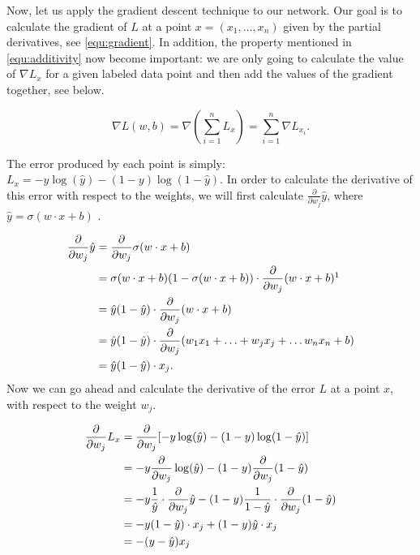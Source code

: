 Now, let us apply the gradient descent technique to our network. Our goal is to calculate the gradient of $L$ at a point $x = (x_1, \ldots, x_n)$ given by the partial derivatives, see \cref{equ:gradient}. In addition, the property mentioned in \cref{equ:additivity} now become important: we are only going to calculate the value of $\nabla L_x$ for a given labeled data point and then add the values of the gradient together, see below.

\begin{equation}
  \nabla L(w, b) = \nabla (\sum_{i = 1}^{n} L_x) = \sum_{i = 1}^{n} \nabla L_{x_i}.
\end{equation}

The error produced by each point is simply: $ L_x = -y \log (\hat{y}) - (1 - y) \log (1 - \hat{y})$. In order to calculate the derivative of this error with respect to the weights, we will first calculate $ \frac{\partial}{\partial w_j} \hat{y}$, where $ \hat{y} = \sigma (w \cdot x + b)$ \cite{ud188}.

\begin{align*}
  \frac{\partial}{\partial w_j} \hat{y} &= \frac{\partial}{\partial w_j} \sigma (w \cdot x + b) \\
     &= \sigma (w \cdot x + b) (1 - \sigma (w \cdot x + b)) \cdot \frac{\partial}{\partial w_j} (w \cdot x + b)\footnotemark \\
     &= \hat{y} (1 - \hat{y}) \cdot \frac{\partial}{\partial w_j} (w \cdot x + b) \\
     &= \hat{y} (1 - \hat{y}) \cdot \frac{\partial}{\partial w_j} (w_1 x_1 + \ldots + w_j x_j + \ldots w_n x_n + b) \\
     &= \hat{y} (1 - \hat{y}) \cdot x_j.
\end{align*}
Now we can go ahead and calculate the derivative of the error $L$ at a point $x$, with respect to the weight $w_j$.

\begin{align*}
  \frac{\partial}{\partial w_j} L_x &= \frac{\partial}{\partial w_j} [-y \log (\hat{y}) - (1 - y) \log (1 - \hat{y})] \\
     &= -y \frac{\partial}{\partial w_j} \log (\hat{y}) - (1 - y) \frac{\partial}{\partial w_j} (1 - \hat{y}) \\
     &= -y \frac{1}{\hat{y}} \cdot \frac{\partial}{\partial w_j} \hat{y} - (1 - y) \frac{1}{1 - \hat{y}} \cdot \frac{\partial}{\partial w_j} (1 - \hat{y}) \\
     &= -y (1 - \hat{y}) \cdot x_j + (1 - y)\hat{y} \cdot x_j \\
     &= -(y - \hat{y}) x_j
\end{align*}

